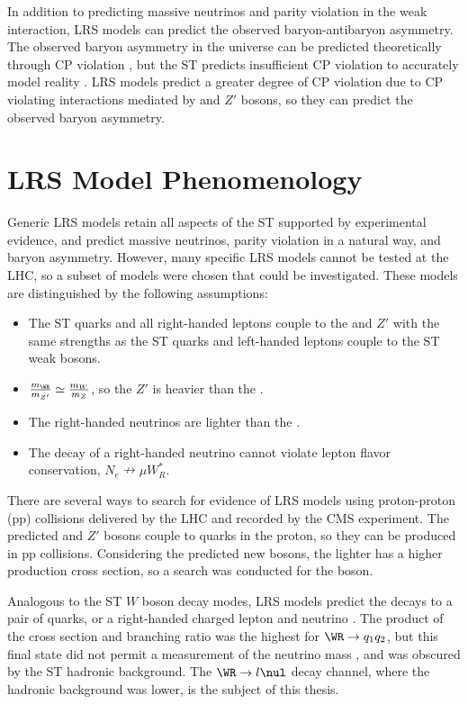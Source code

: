 In addition to predicting massive neutrinos and parity violation in the weak interaction, LRS models can 
predict the observed baryon-antibaryon asymmetry.  The observed baryon asymmetry in the universe can be 
predicted theoretically through CP violation \cite{saharov}, but the ST predicts insufficient CP violation 
to accurately model reality \cite{surveyOfExtensions}.  LRS models predict a greater degree of CP violation 
due to CP violating interactions mediated by \WR and $Z'$ bosons, so they can predict the observed baryon 
asymmetry.


\section{LRS Model Phenomenology}
\label{sec:lrsPhenomenology}
Generic LRS models retain all aspects of the ST supported by experimental evidence, and predict massive 
neutrinos, parity violation in a natural way, and baryon asymmetry.  However, many specific LRS models 
cannot be tested at the LHC, so a subset of models were chosen that could be investigated.  These models 
are distinguished by the following assumptions:

\begin{itemize}
	\item The ST quarks and all right-handed leptons couple to the \WR and $Z'$ with the same strengths 
		as the ST quarks and left-handed leptons couple to the ST weak bosons.
	\item $\frac{m_{\WR}}{m_{Z'}} \simeq \frac{m_{W}}{m_{Z}}$, so the $Z'$ is heavier than the \WR.
	\item The right-handed neutrinos \nul are lighter than the \WR.
	\item The decay of a right-handed neutrino cannot violate lepton flavor conservation, $N_{e} \nrightarrow \mu W^{*}_{R}$.
\end{itemize}

There are several ways to search for evidence of LRS models using proton-proton (pp) collisions delivered 
by the LHC and recorded by the CMS experiment.  The predicted \WR and $Z'$ bosons couple to quarks in the 
proton, so they can be produced in pp collisions.  Considering the predicted new bosons, the lighter \WR 
has a higher production cross section, so a search was conducted for the \WR boson.

Analogous to the ST $W$ boson decay modes, LRS models predict the \WR decays to a pair of quarks, or a 
right-handed charged lepton and neutrino \nul.  The product of the cross section and branching ratio 
was the highest for $\WR \rightarrow q_{1}q_{2}$, but this final state did not permit a measurement of 
the neutrino mass \mnul, and was obscured by the ST hadronic background.  The $\WR \rightarrow l\nul$ 
decay channel, where the hadronic background was lower, is the subject of this thesis.



